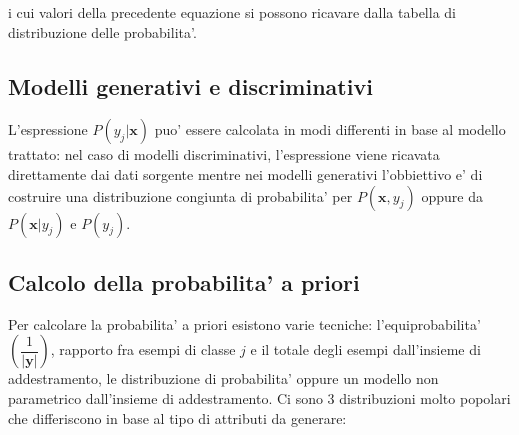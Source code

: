 i cui valori della precedente equazione si possono ricavare dalla tabella di distribuzione delle probabilita'.

\subsection*{Modelli generativi e discriminativi}
L'espressione $P(y_j|\textbf{x})$ puo' essere calcolata in modi differenti in base al modello trattato: nel caso di modelli discriminativi, l'espressione viene ricavata direttamente dai dati sorgente mentre nei modelli generativi l'obbiettivo e' di costruire una distribuzione congiunta di probabilita' per $P(\textbf{x}, y_j)$ oppure da $P(\textbf{x}| y_j)$ e $P(y_j)$.

\subsection*{Calcolo della probabilita' a priori}
  Per calcolare la probabilita' a priori esistono varie tecniche: l'equiprobabilita' $\left(\dfrac{1}{|\textbf{y}|}\right)$, rapporto fra esempi di classe $j$ e il totale degli esempi dall'insieme di addestramento, le distribuzione di probabilita' oppure un modello non parametrico dall'insieme di addestramento. Ci sono 3 distribuzioni molto popolari che differiscono in base al tipo di attributi da generare:
